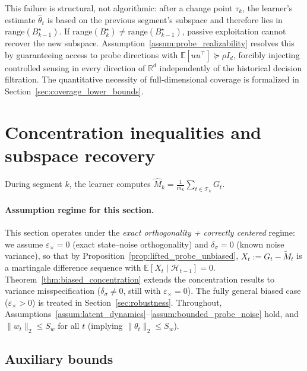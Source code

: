 \documentclass[12pt]{article}
\newcommand{\R}{\mathbb{R}}
\newcommand{\E}{\mathbb{E}}
\newcommand{\cH}{\mathcal{H}}
\newcommand{\cT}{\mathcal{T}}
\newcommand{\range}{\mathrm{range}}
\theoremstyle{plain}
\theoremstyle{definition}
\begin{document}
This failure is structural, not algorithmic: after a change point $\tau_k$, the learner's estimate $\widehat{\theta}_t$ is based on the previous segment's subspace and therefore lies in $\range(B_{k-1}^\star)$. If $\range(B_k^\star) \neq \range(B_{k-1}^\star)$, passive exploitation cannot recover the new subspace. Assumption~\ref{assum:probe_realizability} resolves this by guaranteeing access to probe directions with $\E[uu^\top] \succeq \rho I_d$, forcibly injecting controlled sensing in every direction of $\R^d$ independently of the historical decision filtration. The quantitative necessity of full-dimensional coverage is formalized in Section~\ref{sec:coverage_lower_bounds}.


\section{Concentration inequalities and subspace recovery}
\label{sec:concentration}

During segment $k$, the learner computes $\widehat{M}_k = \frac{1}{m_k}\sum_{t \in \cT_k} G_t$.

\paragraph{Assumption regime for this section.}
This section operates under the \emph{exact orthogonality + correctly centered} regime: we assume $\varepsilon_\times = 0$ (exact state--noise orthogonality) and $\delta_\sigma = 0$ (known noise variance), so that by Proposition~\ref{prop:lifted_probe_unbiased}, $X_t := G_t - \widetilde{M}_t$ is a martingale difference sequence with $\E[X_t \mid \cH_{t-1}] = 0$. Theorem~\ref{thm:biased_concentration} extends the concentration results to variance misspecification ($\delta_\sigma \neq 0$, still with $\varepsilon_\times = 0$). The fully general biased case ($\varepsilon_\times > 0$) is treated in Section~\ref{sec:robustness}. Throughout, Assumptions~\ref{assum:latent_dynamics}--\ref{assum:bounded_probe_noise} hold, and $\|w_t\|_2 \le S_w$ for all $t$ (implying $\|\theta_t\|_2 \le S_w$).

\subsection{Auxiliary bounds}
\end{document}
